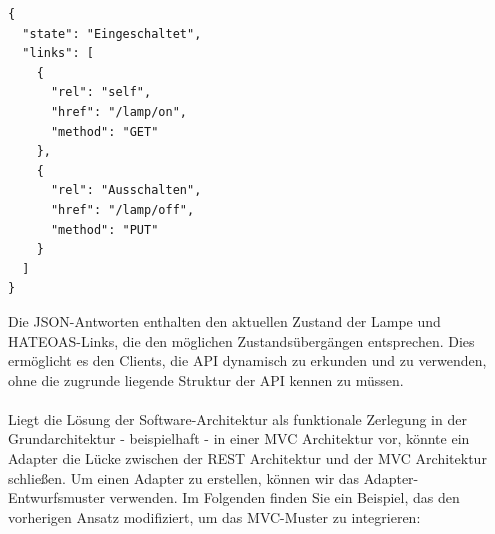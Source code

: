 \documentclass[../vs-script-first-v01.tex]{subfiles}
\begin{document}
\noindent\begin{minipage}{\textwidth}
\begin{lstlisting}[caption={Fallbeispiel REST - an},captionpos=b,label={lst:rest_an}]
{
  "state": "Eingeschaltet",
  "links": [
    {
      "rel": "self",
      "href": "/lamp/on",
      "method": "GET"
    },
    {
      "rel": "Ausschalten",
      "href": "/lamp/off",
      "method": "PUT"
    }
  ]
}
\end{lstlisting}
\end{minipage}
Die JSON-Antworten enthalten den aktuellen Zustand der Lampe und HATEOAS-Links, die den möglichen Zustandsübergängen entsprechen. Dies ermöglicht es den Clients, die API dynamisch zu erkunden und zu verwenden, ohne die zugrunde liegende Struktur der API kennen zu müssen.\\\\

Liegt die Lösung der Software-Architektur als funktionale Zerlegung in der Grundarchitektur - beispielhaft - in einer MVC Architektur vor, könnte ein Adapter die Lücke zwischen der REST Architektur und der MVC Architektur schließen. Um einen Adapter zu erstellen, können wir das Adapter-Entwurfsmuster verwenden. Im Folgenden finden Sie ein Beispiel, das den vorherigen Ansatz modifiziert, um das MVC-Muster zu integrieren:
\end{document}

